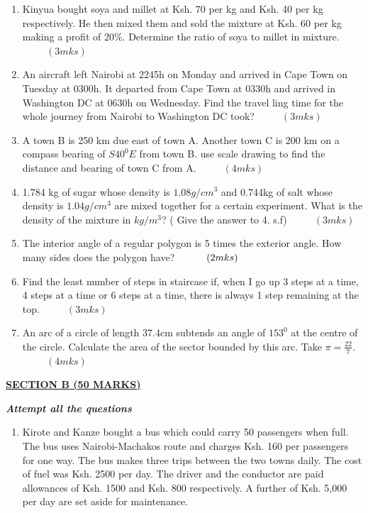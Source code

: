 \documentclass[
  a4paperpaper,
]{scrbook}
\begin{document}
\begin{tcolorbox}
\begin{enumerate}
\def\labelenumi{\arabic{enumi}.}
\setcounter{enumi}{9}
\item
  Kinyua bought soya and millet at Ksh. 70 per kg and Ksh. 40 per kg
  respectively. He then mixed them and sold the mixture at Ksh. 60 per
  kg making a profit of 20\%. Determine the ratio of soya to millet in
  mixture. \(\hspace{1cm} (3mks)\)
\item
  An aircraft left Nairobi at 2245h on Monday and arrived in Cape Town
  on Tuesday at 0300h. It departed from Cape Town at 0330h and arrived
  in Washington DC at 0630h on Wednesday. Find the travel ling time for
  the whole journey from Nairobi to Washington DC took?
  \(\hspace{1cm} (3mks)\)
\item
  A town B is 250 km due east of town A. Another town C is 200 km on a
  compass bearing of \(S40^0E\) from town B. use scale drawing to find
  the distance and bearing of town C from A. \(\hspace{1cm}(4mks)\)
\item
  1.784 kg of sugar whose density is \(1.08g/cm^3\) and 0.744kg of salt
  whose density is \(1.04g/cm^3\) are mixed together for a certain
  experiment. What is the density of the mixture in \(kg/m^3\)? ( Give
  the answer to 4. s.f) \(\hspace{1cm} (3mks)\)
\item
  The interior angle of a regular polygon is 5 times the exterior angle.
  How many sides does the polygon have? \(\hspace{1 cm} (2mks)\)
\item
  Find the least number of steps in staircase if, when I go up 3 steps
  at a time, 4 steps at a time or 6 steps at a time, there is always 1
  step remaining at the top. \(\hspace{1cm} (3mks)\)
\item
  An arc of a circle of length 37.4cm subtends an angle of \(153^0\) at
  the centre of the circle. Calculate the area of the sector bounded by
  this arc. Take \(\pi=\frac{22}{7}\). \(\hspace{1cm} (4mks)\)
\end{enumerate}

\ul{\textbf{SECTION B (50 MARKS)}}

\textbf{\emph{Attempt all the questions}}

\begin{enumerate}
\def\labelenumi{\arabic{enumi}.}
\setcounter{enumi}{16}
\item
  Kirote and Kanze bought a bus which could carry 50 passengers when
  full. The bus uses Nairobi-Machakos route and charges Ksh. 160 per
  passengers for one way. The bus makes three trips between the two
  towns daily. The cost of fuel was Ksh. 2500 per day. The driver and
  the conductor are paid allowances of Ksh. 1500 and Ksh. 800
  respectively. A further of Ksh. 5,000 per day are set aside for
  maintenance.


\end{enumerate}
\end{tcolorbox}
\end{document}
